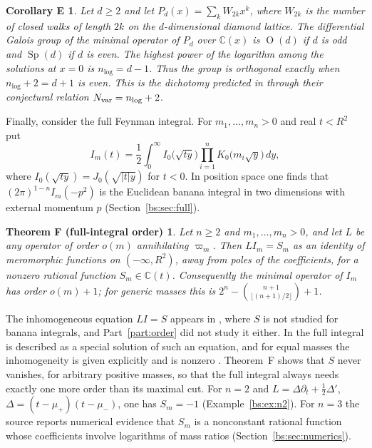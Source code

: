 \documentclass[11pt,a4paper]{article}
\newtheorem*{corollaryE}{Corollary E}
\newtheorem*{theoremF}{Theorem F (full-integral order)}
\theoremstyle{definition}
\theoremstyle{remark}
\numberwithin{equation}{section}
\newcommand{\C}{\mathbb{C}}
\DeclareMathOperator{\Ort}{O}
\DeclareMathOperator{\Sp}{Sp}
\begin{document}
\begin{corollaryE}
Let $d\ge2$ and let $P_d(x)=\sum_kW_{2k}x^k$, where $W_{2k}$ is the number of closed walks of length $2k$ on the $d$-dimensional diamond lattice. The differential Galois group of the minimal operator of $P_d$ over $\C(x)$ is $\Ort(d)$ if $d$ is odd and $\Sp(d)$ if $d$ is even. The highest power of the logarithm among the solutions at $x=0$ is $n_{\log}=d-1$. Thus the group is orthogonal exactly when $n_{\log}+2=d+1$ is even. This is the dichotomy predicted in \cite{HMZ25} through their conjectural relation $N_{\rm var}=n_{\log}+2$.
\end{corollaryE}

Finally, consider the full Feynman integral. For $m_1,\dots,m_n>0$ and real $t<R^2$ put
\begin{equation}\label{bs:eq:I}
I_m(t)=\frac12\int_0^\infty I_0\bigl(\sqrt{ty}\bigr)\prod_{i=1}^nK_0\bigl(m_i\sqrt y\bigr)\,dy ,
\end{equation}
where $I_0(\sqrt{ty})=J_0(\sqrt{|t|y})$ for $t<0$. In position space one finds that $(2\pi)^{1-n}I_m(-p^2)$ is the Euclidean banana integral in two dimensions with external momentum $p$ (Section~\ref{bs:sec:full}).

\begin{theoremF}\label{bs:thm:inhomogeneous}
Let $n\ge2$ and $m_1,\dots,m_n>0$, and let $L$ be any operator of order $o(m)$ annihilating $\varpi_m$. Then $LI_m=S_m$ as an identity of meromorphic functions on $(-\infty,R^2)$, away from poles of the coefficients, for a nonzero rational function $S_m\in\C(t)$. Consequently the minimal operator of $I_m$ has order $o(m)+1$; for generic masses this is $2^n-\binom{n+1}{\lfloor(n+1)/2\rfloor}+1$.
\end{theoremF}

The inhomogeneous equation $LI=S$ appears in \cite[(1.6)]{LV23}, where $S$ is not studied for banana integrals, and Part~\ref{part:order} did not study it either. In \cite{BFKNS21} the full integral is described as a special solution of such an equation, and for equal masses the inhomogeneity is given explicitly and is nonzero \cite[(3.6)]{BFKNS21}. Theorem~F shows that $S$ never vanishes, for arbitrary positive masses, so that the full integral always needs exactly one more order than its maximal cut. For $n=2$ and $L=\Delta\partial_t+\frac12\Delta'$, $\Delta=(t-\mu_+)(t-\mu_-)$, one has $S_m=-1$ (Example~\ref{bs:ex:n2}). For $n=3$ the source reports numerical evidence that $S_m$ is a nonconstant rational function whose coefficients involve logarithms of mass ratios (Section~\ref{bs:sec:numerics}).
\end{document}
